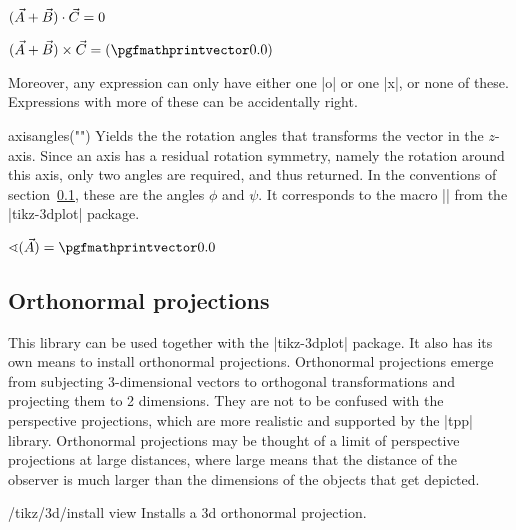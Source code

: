 \documentclass[a4paper]{ltxdoc}
\begin{document}
\begin{codeexample}[width=5.2cm]
%
$(\vec A+\vec B)\cdot\vec C=
\pgfmathprintnumber\pgfmathresult$
\end{codeexample}

\begin{codeexample}[width=5.2cm]
%
$(\vec A+\vec B)\times\vec C=
(\pgfmathprintvector\pgfmathresult)$
\end{codeexample}

Moreover, any expression can only have either one |o| or one |x|, or none of
these. Expressions with more of these can be accidentally right.

\begin{math-function}{axisangles("")}
   Yields the the rotation angles that transforms the vector in the $z$-axis.
   Since an axis has a residual rotation symmetry, namely the rotation around
   this axis, only two angles are required, and thus returned. In the
   conventions of section~\ref{sec:3DOrthonormalProjections}, these are the
   angles $\phi$ and $\psi$. It corresponds to the macro
   || from the |tikz-3dplot|
   package.
\end{math-function}

\begin{codeexample}[width=5.2cm]
%
$\sphericalangle(\vec A)=
\pgfmathprintvector\pgfmathresult$
\end{codeexample}

\subsection{Orthonormal projections}
\label{sec:3DOrthonormalProjections}

This library can be used together with the |tikz-3dplot| package. It also has
its own means to install orthonormal projections. Orthonormal projections emerge
from subjecting 3-dimensional vectors to orthogonal transformations and
projecting them to 2 dimensions. They are not to be confused with the
perspective projections, which are more realistic and supported by the |tpp|
library. Orthonormal projections may be thought of a limit of perspective
projections at large distances, where large means that the distance of the
observer is much larger than the dimensions of the objects that get depicted. 

\begin{key}{/tikz/3d/install view}
        Installs a 3d orthonormal projection.
\end{key}
\end{document}
